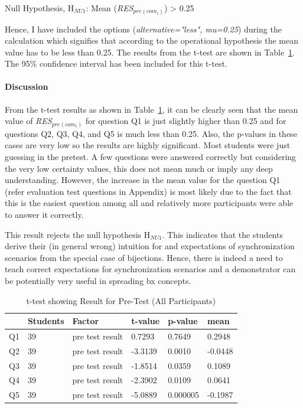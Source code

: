 Null Hypothesis, {H$_{NU1}$}: Mean (\textit{RES$_{pre(com_i)}$}) > 0.25 

Hence, I have included the options (\textit{alternative="less", mu=0.25}) during the calculation which signifies that according to the operational hypothesis the mean value has to be less than 0.25. The results from the t-test are shown in Table~\ref{tab:t-test_PreTest}. The 95\% confidence interval has been included for this t-test.

\paragraph{Discussion}
From the t-test results as shown in Table~\ref{tab:t-test_PreTest}, it can be clearly seen that the mean value of \textit{RES$_{pre(com_i)}$} for question Q1 is just slightly higher than 0.25 and for questions Q2, Q3, Q4, and Q5 is much less than 0.25. Also, the p-values in these cases are very low so the results are highly significant. Most students were just guessing in the pretest.  A few questions were answered correctly but considering the very low certainty values, this does not mean much or imply any deep understanding. However, the increase in the mean value for the question Q1 (refer evaluation test questions in Appendix) is most likely due to the fact that this is the easiest question among all and relatively more participants were able to answer it correctly.

This result rejects the null hypothesis {H$_{NU1}$}. This indicates that the students derive their (in general wrong) intuition for and expectations of synchronization scenarios from the special case of bijections. Hence, there is indeed a need to teach correct expectations for synchronization scenarios and a demonstrator can be potentially very useful in spreading bx concepts.

\begin{table}[ht]
	\centering	
	\begin{tabular}{|p{1cm}|p{1.5cm}|p{4cm}|p{1.5cm}|p{1.5cm}|p{1.5cm}|}
		\hline
		\rowcolor[gray]{.8}	
		\textbf{} & \textbf{Students} & \textbf{Factor} & \textbf{t-value} & \textbf{p-value} & \textbf{mean}\\
		\hline
		Q1 & 39 & pre test result & 0.7293 & 0.7649 & 0.2948\\
		\hline
		Q2 & 39 & pre test result & -3.3139 & 0.0010 & -0.0448\\
		\hline
		Q3 & 39 & pre test result & -1.8514 & 0.0359 & 0.1089\\
		\hline	
		Q4 & 39 & pre test result & -2.3902 & 0.0109 & 0.0641\\
		\hline
		Q5 & 39 & pre test result & -5.0889 & 0.000005 & -0.1987\\
		\hline			
	\end{tabular}
	\caption{t-test showing Result for Pre-Test (All Participants)}
	\label{tab:t-test_PreTest}
\end{table}

